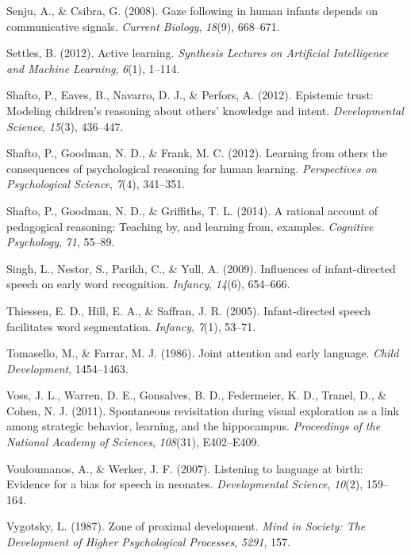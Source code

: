 \documentclass[a4paper,man,apacite,floatsintext]{apa6}
\begin{document}
\hypertarget{ref-senju2008gaze}{}
Senju, A., \& Csibra, G. (2008). Gaze following in human infants depends
on communicative signals. \emph{Current Biology}, \emph{18}(9),
668--671.

\hypertarget{ref-settles2012active}{}
Settles, B. (2012). Active learning. \emph{Synthesis Lectures on
Artificial Intelligence and Machine Learning}, \emph{6}(1), 1--114.

\hypertarget{ref-shafto2012epistemic}{}
Shafto, P., Eaves, B., Navarro, D. J., \& Perfors, A. (2012). Epistemic
trust: Modeling children's reasoning about others' knowledge and intent.
\emph{Developmental Science}, \emph{15}(3), 436--447.

\hypertarget{ref-shafto2012learning}{}
Shafto, P., Goodman, N. D., \& Frank, M. C. (2012). Learning from others
the consequences of psychological reasoning for human learning.
\emph{Perspectives on Psychological Science}, \emph{7}(4), 341--351.

\hypertarget{ref-shafto2014rational}{}
Shafto, P., Goodman, N. D., \& Griffiths, T. L. (2014). A rational
account of pedagogical reasoning: Teaching by, and learning from,
examples. \emph{Cognitive Psychology}, \emph{71}, 55--89.

\hypertarget{ref-singh2009influences}{}
Singh, L., Nestor, S., Parikh, C., \& Yull, A. (2009). Influences of
infant-directed speech on early word recognition. \emph{Infancy},
\emph{14}(6), 654--666.

\hypertarget{ref-thiessen2005infant}{}
Thiessen, E. D., Hill, E. A., \& Saffran, J. R. (2005). Infant-directed
speech facilitates word segmentation. \emph{Infancy}, \emph{7}(1),
53--71.

\hypertarget{ref-tomasello1986joint}{}
Tomasello, M., \& Farrar, M. J. (1986). Joint attention and early
language. \emph{Child Development}, 1454--1463.

\hypertarget{ref-voss2011spontaneous}{}
Voss, J. L., Warren, D. E., Gonsalves, B. D., Federmeier, K. D., Tranel,
D., \& Cohen, N. J. (2011). Spontaneous revisitation during visual
exploration as a link among strategic behavior, learning, and the
hippocampus. \emph{Proceedings of the National Academy of Sciences},
\emph{108}(31), E402--E409.

\hypertarget{ref-vouloumanos2007listening}{}
Vouloumanos, A., \& Werker, J. F. (2007). Listening to language at
birth: Evidence for a bias for speech in neonates. \emph{Developmental
Science}, \emph{10}(2), 159--164.

\hypertarget{ref-vygotsky1987zone}{}
Vygotsky, L. (1987). Zone of proximal development. \emph{Mind in
Society: The Development of Higher Psychological Processes},
\emph{5291}, 157.
\end{document}
